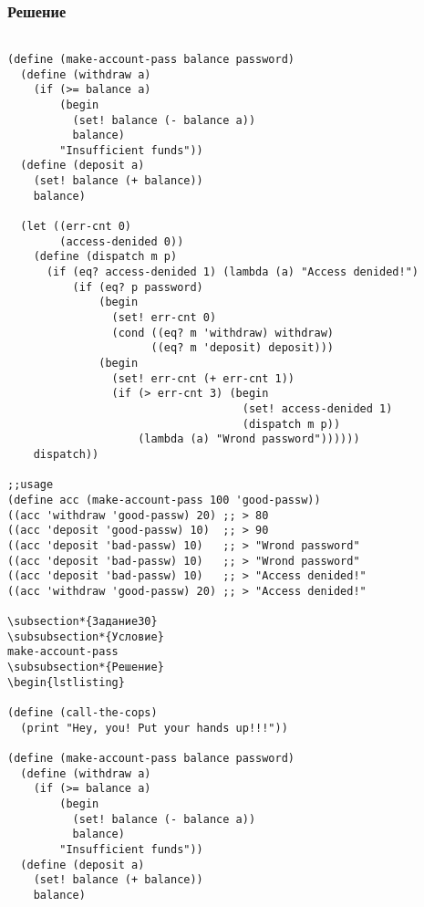 \documentclass[10pt,a4paper]{article}
\begin{document}
\subsubsection*{Решение}
\begin{lstlisting}

(define (make-account-pass balance password)
  (define (withdraw a)
    (if (>= balance a)
        (begin
          (set! balance (- balance a))
          balance)
        "Insufficient funds"))
  (define (deposit a)
    (set! balance (+ balance))
    balance)
  
  (let ((err-cnt 0)
        (access-denided 0))
    (define (dispatch m p)
      (if (eq? access-denided 1) (lambda (a) "Access denided!")
          (if (eq? p password)
              (begin
                (set! err-cnt 0)
                (cond ((eq? m 'withdraw) withdraw)
                      ((eq? m 'deposit) deposit)))
              (begin
                (set! err-cnt (+ err-cnt 1))
                (if (> err-cnt 3) (begin
                                    (set! access-denided 1)
                                    (dispatch m p))
                    (lambda (a) "Wrond password"))))))
    dispatch))

;;usage
(define acc (make-account-pass 100 'good-passw))
((acc 'withdraw 'good-passw) 20) ;; > 80
((acc 'deposit 'good-passw) 10)  ;; > 90
((acc 'deposit 'bad-passw) 10)   ;; > "Wrond password"
((acc 'deposit 'bad-passw) 10)   ;; > "Wrond password"
((acc 'deposit 'bad-passw) 10)   ;; > "Access denided!"
((acc 'withdraw 'good-passw) 20) ;; > "Access denided!"

\subsection*{Задание30}
\subsubsection*{Условие}
make-account-pass
\subsubsection*{Решение}
\begin{lstlisting}

(define (call-the-cops)
  (print "Hey, you! Put your hands up!!!"))

(define (make-account-pass balance password)
  (define (withdraw a)
    (if (>= balance a)
        (begin
          (set! balance (- balance a))
          balance)
        "Insufficient funds"))
  (define (deposit a)
    (set! balance (+ balance))
    balance)
  

\end{lstlisting}
\end{document}
